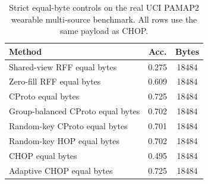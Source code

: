 ﻿\begin{table}[t]
\centering
\caption{Strict equal-byte controls on the real UCI PAMAP2 wearable multi-source benchmark. All rows use the same payload as CHOP.}
\label{tab:strict-equal-byte-pamap2}
\begin{tabular}{lcc}
\toprule
Method & Acc. & Bytes \\
\midrule
Shared-view RFF equal bytes & 0.275 & 18484 \\
Zero-fill RFF equal bytes & 0.609 & 18484 \\
CProto equal bytes & 0.725 & 18484 \\
Group-balanced CProto equal bytes & 0.702 & 18484 \\
Random-key CProto equal bytes & 0.701 & 18484 \\
Random-key HOP equal bytes & 0.702 & 18484 \\
CHOP equal bytes & 0.495 & 18484 \\
Adaptive CHOP equal bytes & 0.725 & 18484 \\
\bottomrule
\end{tabular}
\end{table}


